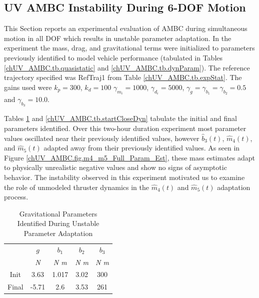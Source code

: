 
\subsection{\ac{UV} \ac{AMBC} Instability During 6-\ac{DOF} Motion}
\label{chUV_AMBC.sec.fullAnalysisFailure}



This Section reports an experimental evaluation of \ac{AMBC} during
simultaneous motion in all \ac{DOF} which results in unstable parameter
adaptation.
%
%
%
In the experiment the mass, drag, and gravitational terms were
initialized to parameters previously identified to model vehicle
performance (tabulated in Tables \ref{chUV_AMBC.tb.quasistatic} and
\ref{chUV_AMBC.tb.dynParam}). The reference trajectory specified was
RefTraj1 from Table \ref{chUV_AMBC.tb.expStat}. The gains used
were $k_p=300$, $k_d=100$ $\gamma_{m_i}=1000$, $\gamma_{d_i}=5000$,
$\gamma_{g}=\gamma_{b_1}=\gamma_{b_2}=0.5$ and $\gamma_{b_3}=10.0$.


Tables \ref{chUV_AMBC.tb.startCloseGrav} and
\ref{chUV_AMBC.tb.startCloseDyn} tabulate the initial and final
parameters identified.  Over this two-hour duration experiment most
parameter values oscillated near their previously identified values,
however $\hat{b}_3(t)$, $\hat{m}_4(t)$, and $\hat{m}_5(t)$ adapted away
from their previously identified values.  As seen in Figure
\ref{chUV_AMBC.fig.m4_m5_Full_Param_Est}, these mass estimates adapt
to physically unrealistic negative values and show no signs of
asymptotic behavior.  
%
The instability observed in this experiment motivated us to examine
the role of unmodeled thruster dynamics in the $\hat{m}_4(t)$ and
$\hat{m}_5(t)$ adaptation process.


\begin{table}[htbp]
\ssp
\caption{Gravitational Parameters Identified During Unstable Parameter Adaptation}
\begin{center}
\begin{tabular}{c|cccc}
      & $g$ & $b_1$ & $b_2$ & $b_3$   \\
      & {\it N} & {\it N m} & {\it N m} & {\it N m} \\ \hline
Init &  3.63 & 1.017 & 3.02 & 300   \\
Final&  -5.71   &  2.6      & 3.53     & 261 \\ 
\end{tabular}
\end{center}
\label{chUV_AMBC.tb.startCloseGrav}
\vspace*{-5mm}
\end{table}



